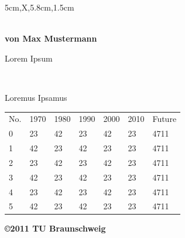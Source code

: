 \documentclass[a3paper,scifiposter,style=scifi,table]{tubsposter}
\begin{document}
  \begin{tubsposter}{5cm,X,5.8cm,1.5cm}
  \begin{posterrow}[bgcolor=tuLightGray]
    \bfseries{}\\[1em]
    von Max Mustermann
  \end{posterrow}
  \begin{posterrow}[X,X]
    \begin{postercol}
      {Lorem Ipsum}\\[2ex]
      \lipsum[1-2]
    \end{postercol}
    \begin{postercol}[X,X]
      \begin{postersubrow}[bgimage=infozentrum,imagefit=autoclip]
        ~
      \end{postersubrow}
      \begin{postersubrow}[bgcolor=tuOrange]
        \centering\itshape
        \lipsum[4]\par
        \raggedleft\upshape
        Loremus Ipsamus
      \end{postersubrow}
    \end{postercol}
  \end{posterrow}
  \begin{modrow*}
    \large
     
    \begin{tabularx}{\textwidth}{lXXXXXX}
      \rowcolor{tuGray20}
      No. & 1970 & 1980 & 1990 & 2000 & 2010 & Future \\
      0   & 23   & 42   & 23   & 42   & 23   & 4711 \\
      1   & 42   & 23   & 42   & 23   & 23   & 4711 \\
      2   & 23   & 42   & 23   & 42   & 23   & 4711 \\
      3   & 42   & 23   & 42   & 23   & 23   & 4711 \\
      4   & 23   & 42   & 23   & 42   & 23   & 4711 \\
      5   & 42   & 23   & 42   & 23   & 23   & 4711 \\
    \end{tabularx}
  \end{modrow*}
  \begin{modrow}[bgcolor=tuGreen]
    \bfseries\raggedleft\textcolor{tuWhite}{\copyright 2011 TU Braunschweig}
  \end{modrow}
\end{tubsposter}
\end{document}
